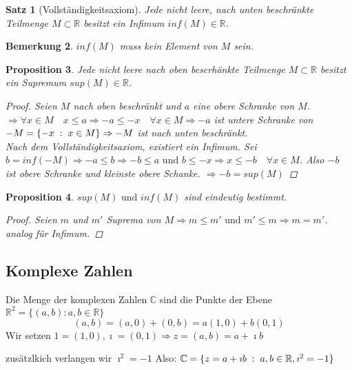 \documentclass[a4paper,titlepage,oneside]{article}
\def\C{\ensuremath{\mathbb{C}} }
\def\R{\ensuremath{\mathbb{R}} }
\def\im{\ensuremath{\imath} }
\def\fa{\ensuremath{\forall}}
\def\sp{\hspace{0,1cm}}
\newcommand{\menge}[2]{\ensuremath{\{#1\sp : \sp #2\}}}
\theoremstyle{thmstyle}
\newtheorem{satz}{Satz}[subsection]
\newtheorem{prop}[satz]{Proposition}
\newtheorem{bem}[satz]{Bemerkung}
\begin{document}
\begin{satz}[Vollständigkeitsaxiom]
Jede nicht leere, nach unten beschränkte Teilmenge \(M \subset \R\)  besitzt ein Infimum \(inf(M) \in \R\).
\end{satz}

\begin{bem}
\(inf(M)\) muss kein Element von \(M\) sein.
\end{bem}

\begin{prop}
Jede nicht leere nach oben bescrhänkte Teilmenge \(M \subset \R\) besitzt ein Supremum \(sup(M) \in \R\).
\begin{proof}
Seien \(M\) nach oben beschränkt und \(a\) eine obere Schranke von \(M\). 
\(\Rightarrow \fa x \in M  \quad x \le a \Rightarrow -a \le -x \quad \fa x \in M \Rightarrow -a\) ist untere Schranke von \(-M = \menge{-x}{x \in M} \Rightarrow -M\) ist nach unten beschränkt.\\
Nach dem Vollständigkeitsaxiom, existiert ein Infimum. Sei \(b= inf(-M) \Rightarrow -a \le b \Rightarrow -b \le a \text{ und } b \le -x \Rightarrow x \le -b \quad \forall x \in M\). Also \(-b\) ist obere Schranke und kleinste obere Schanke. \(\Rightarrow -b = sup(M)\)
\end{proof}
\end{prop}

\begin{prop}
\(sup(M) \text{ und } inf(M)\) sind eindeutig bestimmt.
\begin{proof}
Seien \(m\) und \(m'\) Suprema von \(M \Rightarrow m \le m' \text{ und } m' \le m \Rightarrow m = m'\).\\
analog für Infimum.
\end{proof}
\end{prop}

\newpage
\subsection{Komplexe Zahlen}
Die Menge der komplexen Zahlen \C sind die Punkte der Ebene \(\R^2 = \{(a,b) : a,b \in \R\}\)
\[(a,b) = (a, 0) + (0, b) = a (1,0) + b (0, 1)\]
Wir setzen \(1 = (1,0), \im = (0,1) \Rightarrow z = (a, b) = a + \im b\)\\
\begin{center}
\end{center}
zusätzlkich verlangen wir \(\im^2 = -1\) Also: \(\C = \menge{z = a + \im b }{ a, b \in \R, \im^2 = -1 }\)
\end{document}
